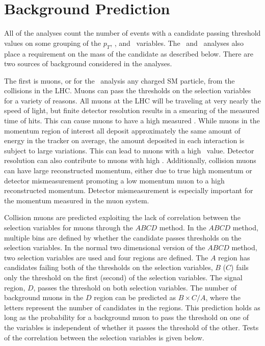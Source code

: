 \section{Background Prediction \label{BackPred}}
All of the analyses count the number of events with a candidate passing threshold values on some grouping of the $p_T$, \invbeta, 
and \ias\ variables. The \tktof\  and \tkonly\ analyses also place a requirement on the mass of the candidate as described below. There are two sources
of background considered in the analyses. 

The first is muons, or for the \tkonly\ analysis any charged SM particle, from the collisions in the LHC. Muons can pass the thresholds on the selection variables
for a variety of reasons.
All muons at the LHC will be traveling at very nearly the speed of light,
but finite detector resolution results in a smearing of the measured time of hits. This can cause muons to have a high measured \invbeta.
While muons in the momentum region of interest all deposit approximately
the same amount of energy in the tracker on average, the amount deposited in each interaction is subject to large variations. This can lead to muons
with a high \dedx\ value. Detector resolution can also contribute to muons with high \dedx.
Additionally, collision muons can have large reconstructed momentum, either due to true high momentum or detector mismeasurement
promoting a low momentum muon to a high reconstructed momentum. Detector mismeasurement is especially important for the momentum measured in the muon system.

Collision muons are predicted exploiting the lack of correlation between the selection variables for muons through the $ABCD$ method.
In the $ABCD$ method, multiple bins are defined by whether the candidate passes thresholds on the selection variables. In the normal two dimensional version
of the $ABCD$ method, two selection variables are used and four regions are defined. The $A$ region has candidates failing both of the thresholds on the selection
variables, $B$ ($C$) fails only the threshold on the first (second) of the selection variables. The signal region, $D$, passes the threshold on both selection
variables. The number of background muons in the $D$ region can be predicted as $B \times C / A$, where the letters represent the number of candidates in the regions.
This prediction holds as long as the probability for a background
muon to pass the threshold on one of the variables is independent of whether it passes the threshold of the other. Tests of the correlation between the selection variables is
given below.

